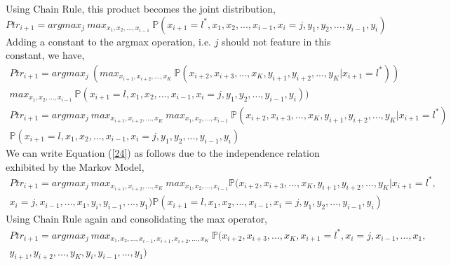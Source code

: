 \documentclass[12pt, draftcls, onecolumn]{IEEEtran}
\begin{document}
Using Chain Rule, this product becomes the joint distribution,
\begin{equation}\label{22}
        Ptr_{i+1}=argmax_j\ max_{x_1,x_2,...,x_{i-1}}\ \mathbb P(x_{i+1}=l^*,x_1,x_2,...,x_{i-1},x_{i}=j,y_1,y_2,...,y_{i-1},y_{i})
\end{equation}
Adding a constant to the argmax operation, i.e. $j$ should not feature in this constant, we have,
\begin{equation}\label{23}
    \begin{aligned}
        Ptr_{i+1}=argmax_j\ (max_{x_{i+1},x_{i+2},...,x_K}\ \mathbb P(x_{i+2},x_{i+3},...,x_K,y_{i+1},y_{i+2},...,y_{K}|x_{i+1}=l^*))\\max_{x_1,x_2,...,x_{i-1}}\ \mathbb P(x_{i+1}=l,x_1,x_2,...,x_{i-1},x_{i}=j,y_1,y_2,...,y_{i-1},y_{i}))
    \end{aligned}
\end{equation}
\begin{equation}\label{24}
    \begin{aligned}
        Ptr_{i+1}=argmax_j\ max_{x_{i+1},x_{i+2},...,x_K}\ max_{x_1,x_2,...,x_{i-1}}\ \mathbb P(x_{i+2},x_{i+3},...,x_K,y_{i+1},y_{i+2},...,y_{K}|x_{i+1}=l^*)\\\mathbb P(x_{i+1}=l,x_1,x_2,...,x_{i-1},x_{i}=j,y_1,y_2,...,y_{i-1},y_{i})
    \end{aligned}
\end{equation}
We can write Equation (\ref{24}) as follows due to the independence relation exhibited by the Markov Model,
\begin{equation}\label{25}
    \begin{aligned}
        Ptr_{i+1}=argmax_j\ max_{x_{i+1},x_{i+2},...,x_K}\ max_{x_1,x_2,...,x_{i-1}}\mathbb P(x_{i+2},x_{i+3},...,x_K,y_{i+1},y_{i+2},...,y_{K}|x_{i+1}=l^*,\\x_{i}=j,x_{i-1},...,x_1,y_{i},y_{i-1},...,y_1)\mathbb P(x_{i+1}=l,x_1,x_2,...,x_{i-1},x_{i}=j,y_1,y_2,...,y_{i-1},y_{i})
    \end{aligned}
\end{equation}
Using Chain Rule again and consolidating the max operator,
\begin{equation}\label{26}
    \begin{aligned}
        Ptr_{i+1}=argmax_j\ max_{x_1,x_2,...,x_{i-1},x_{i+1},x_{i+2},...,x_K}\ \mathbb P(x_{i+2},x_{i+3},...,x_K,x_{i+1}=l^*,x_{i}=j,x_{i-1},...,x_1,\\y_{i+1},y_{i+2},...,y_{K},y_{i},y_{i-1},...,y_1)
    \end{aligned}
\end{equation}
\end{document}
